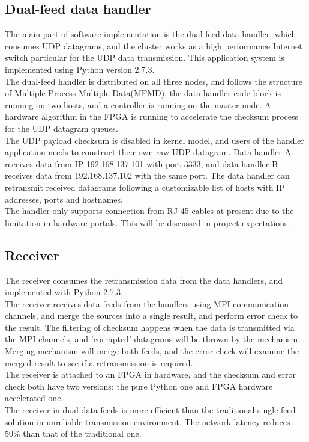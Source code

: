 \documentclass[11pt,openright,a4paper]{report}
\begin{document}
\subsection{Dual-feed data handler}
The main part of software implementation is the dual-feed data handler, which consumes UDP datagrams, and the cluster works as a high performance Internet switch particular for the UDP data transmission. This application system is implemented using Python version 2.7.3.\\
The dual-feed handler is distributed on all three nodes, and follows the structure of Multiple Process Multiple Data(MPMD), the data handler code block is  running on two hosts, and a controller is running on the master node. A hardware algorithm in the FPGA is running to accelerate the checksum process for the UDP datagram queues.\\
The UDP payload checksum is disabled in kernel model, and users of the handler application needs to construct their own raw UDP datagram. Data handler A receives data from IP 192.168.137.101 with port 3333, and data handler B receives data from 192.168.137.102 with the same port. The data handler can retransmit received datagrams following a customizable list of hosts with IP addresses, ports and hostnames.\\
The handler only supports connection from RJ-45 cables at present due to the limitation in hardware portals. This will be discussed in project expectations.\\
\subsection{Receiver}
The receiver consumes the retransmission data from the data handlers, and implemented with Python 2.7.3.\\
The receiver receives data feeds from the handlers using MPI communication channels, and merge the sources into a single result, and perform error check to the result. The filtering of checksum happens when the data is transmitted via the MPI channels, and 'corrupted' datagrams will be thrown by the mechanism. Merging mechanism will merge both feeds, and the error check will examine the merged result to see if a retransmission is required.\\
The receiver is attached to an FPGA in hardware, and the checksum and error check both have two versions: the pure Python one and FPGA hardware accelerated one.\\
The receiver in dual data feeds is more efficient than the traditional single feed solution in unreliable transmission environment. The network latency reduces 50\% than that of the traditional one.\\ 
\end{document}
